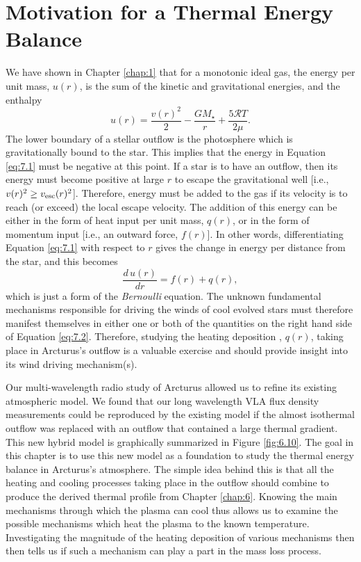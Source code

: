 \section{Motivation for a Thermal Energy Balance}\label{sec:7.1}
We have shown in Chapter \ref{chap:1} that for a monotonic ideal gas, the energy per unit mass, $u(r)$, is the sum of the kinetic and gravitational energies, and the enthalpy
\begin{equation}
\label{eq:7.1}
u(r)=\frac{v(r)^2}{2}-\frac{GM_{\star}}{r}+\frac{5\mathcal{R}T}{2\mu}.
\end{equation}
The lower boundary of a stellar outflow is the photosphere which is gravitationally bound to the star. This implies that the energy in Equation \ref{eq:7.1} must be negative at this point. If a star is to have an outflow, then its energy must become positive at large $r$ to escape the gravitational well [i.e., $v(r)^2 \geq v_{\rm{esc}}(r)^2$]. Therefore, energy must be added to the gas if its velocity is to reach (or exceed) the local escape velocity. The addition of this energy can be either in the form of heat input per unit mass, $q(r)$, or in the form of momentum input [i.e., an outward force, $f(r)$]. In other words, differentiating Equation \ref{eq:7.1} with respect to $r$ gives the change in energy per distance from the star, and this becomes
\begin{equation}
\label{eq:7.2}
\frac{d\,u(r)}{dr}=f(r)+q(r),
\end{equation}
which is just a form of the \textit{Bernoulli} equation. The unknown fundamental mechanisms responsible for driving the winds of cool evolved stars must therefore manifest themselves in either one or both of the quantities on the right hand side of Equation \ref{eq:7.2}. Therefore, studying the heating deposition , $q(r)$, taking place in Arcturus's outflow is a valuable exercise and should provide insight into its wind driving mechanism(s).

Our multi-wavelength radio study of Arcturus allowed us to refine its existing atmospheric model. We found that our long wavelength VLA flux density measurements could be reproduced by the existing model if the almost isothermal outflow was replaced with an outflow that contained a large thermal gradient. This new hybrid model is graphically summarized in Figure \ref{fig:6.10}. The goal in this chapter is to use this new model as a foundation to study the thermal energy balance in Arcturus's atmosphere. The simple idea behind this is that all the heating and cooling processes taking place in the outflow should combine to produce the derived thermal profile from Chapter \ref{chap:6}. Knowing the main mechanisms through which the plasma can cool thus allows us to examine the possible mechanisms which heat the plasma to the known temperature. Investigating the magnitude of the heating deposition of various mechanisms then then tells us if such a mechanism can play a part in the mass loss process.

